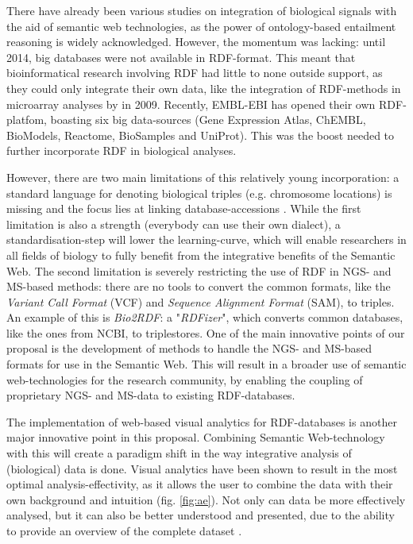 \documentclass[twoside,fontsize=10pt]{article}
\begin{document}
\noindent
There have already been various studies on integration of biological signals with the aid of semantic web technologies, as the power of ontology-based entailment reasoning is widely acknowledged\cite{Sahoo2008}. However, the momentum was lacking: until 2014, big databases were not available in RDF-format. This meant that bioinformatical research involving RDF had little to none outside support, as they could only integrate their own data, like the integration of RDF-methods in microarray analyses by \citet{Szpakowski2009} in 2009. Recently, EMBL-EBI has opened their own RDF-platfom, boasting six big data-sources (Gene Expression Atlas, ChEMBL, BioModels, Reactome, BioSamples and UniProt)\cite{Jupp2014}. This was the boost needed to further incorporate RDF in biological analyses.

However, there are two main limitations of this relatively young incorporation: a standard language for denoting biological triples (e.g. chromosome locations) is missing and the focus lies at linking database-accessions \citep{Ruttenberg2007}. While the first limitation is also a strength (everybody can use their own dialect), a standardisation-step will lower the learning-curve, which will enable researchers in all fields of biology to fully benefit from the integrative benefits of the Semantic Web. The second limitation is  severely restricting the use of RDF in NGS- and MS-based methods: there are no tools to convert the common formats, like the \textit{Variant Call Format} (VCF) and \textit{Sequence Alignment Format} (SAM), to triples. An example of this is  \textit{Bio2RDF}\cite{Belleau2008}: a "\textit{RDFizer}", which converts common databases, like the ones from NCBI, to triplestores. One of the main innovative points of our proposal is the development of methods to handle the NGS- and MS-based formats for use in the Semantic Web. This will result in a broader use of semantic web-technologies for the research community, by enabling the coupling of proprietary NGS- and MS-data to existing RDF-databases.
\medskip

\noindent
The implementation of web-based visual analytics for RDF-databases is another major innovative point in this proposal. Combining Semantic Web-technology with this will create a paradigm shift in the way integrative analysis of (biological) data is done. Visual analytics have been shown to result in the most optimal analysis-effectivity, as it allows the user to combine the data with their own background and intuition (fig. \ref{fig:ae}). Not only can data be more effectively analysed, but it can also be better understood and presented, due to the ability to provide an overview of the complete dataset \cite{Thomas2005, Keim}. 
\end{document}
